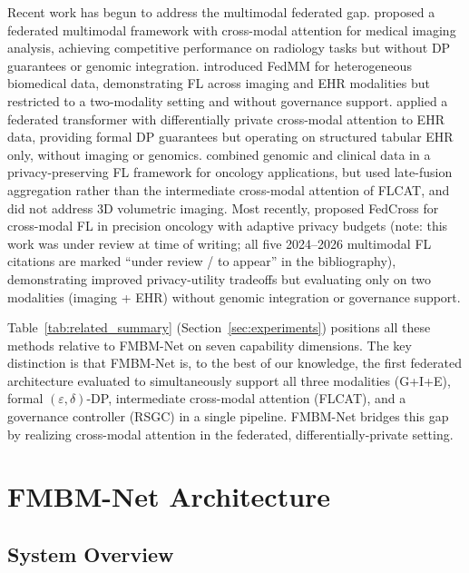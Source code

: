 \documentclass{ieeeaccess}
\begin{document}
Recent work has begun to address the multimodal federated gap.
\cite{chen2024mmfl} proposed a federated multimodal framework with
cross-modal attention for medical imaging analysis, achieving competitive
performance on radiology tasks but without DP guarantees or genomic
integration. \cite{wu2024fedmm} introduced FedMM for heterogeneous
biomedical data, demonstrating FL across imaging and EHR modalities but
restricted to a two-modality setting and without governance support.
\cite{jiang2025fedtrans} applied a federated transformer with differentially
private cross-modal attention to EHR data, providing formal DP guarantees
but operating on structured tabular EHR only, without imaging or genomics.
\cite{yang2025privmmfl} combined genomic and clinical data in a
privacy-preserving FL framework for oncology applications, but used
late-fusion aggregation rather than the intermediate cross-modal attention
of FLCAT, and did not address 3D volumetric imaging.
Most recently, \cite{liu2026fedcross} proposed FedCross for cross-modal FL
in precision oncology with adaptive privacy budgets (note: this work was
under review at time of writing; all five 2024--2026 multimodal FL citations
are marked ``under review / to appear'' in the bibliography), demonstrating improved
privacy-utility tradeoffs but evaluating only on two modalities
(imaging + EHR) without genomic integration or governance support.

Table~\ref{tab:related_summary} (Section~\ref{sec:experiments}) positions
all these methods relative to FMBM-Net on seven capability dimensions.
The key distinction is that FMBM-Net is, to the best of our knowledge, the first
federated architecture evaluated to simultaneously support all three modalities
(G+I+E), formal $(\varepsilon,\delta)$-DP, intermediate cross-modal
attention (FLCAT), and a governance controller (RSGC) in a single pipeline.
FMBM-Net bridges this gap by realizing cross-modal attention in the
federated, differentially-private setting.

\section{FMBM-Net Architecture}
\label{sec:architecture}

\subsection{System Overview}
\end{document}
